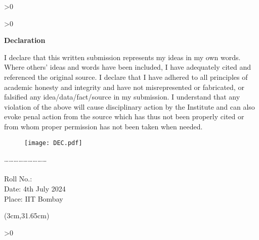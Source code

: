 \ifnum \value{print}>0 {\myemptypage} \else {\clearpage} \fi

\ifnum \value{print}>0 {\setcounter{page}{5}} \fi


{ %

\begin{center}
    \textbf{\LARGE {Declaration}}
\end{center}}
\vspace*{0.1in}
I declare that this written submission represents my ideas in my own words. Where others' ideas and words have been included, I have adequately cited and referenced the original source. I declare that I have adhered to all principles of academic honesty and integrity and have not misrepresented or fabricated, or falsified any idea/data/fact/source in my submission. I understand that any violation of the above will cause disciplinary action by the Institute and can also evoke penal action from the source which has thus not been properly cited or from whom proper permission has not been taken when needed.

\bigskip
\bigskip
\bigskip
\bigskip
\bigskip

\begin{figure}[H]
\texttt{[image: DEC.pdf]}
\end{figure}
\vspace*{-1cm} %
\begin{flushleft}
\ldots \ldots \ldots \ldots \ldots \ldots \ldots \ldots \ldots\\
\vspace{2mm}
\textbf{\authornames} \\
Roll No.: \authorrollno \\
Date: 4th July 2024\\
Place: IIT Bombay
\end{flushleft}
\begin{textblock*}{\textwidth}(3cm,31.65cm) %
    \noindent \texttt{}
\end{textblock*}
\ifnum \value{print}>0 {\myemptypage} \else {\clearpage} \fi

